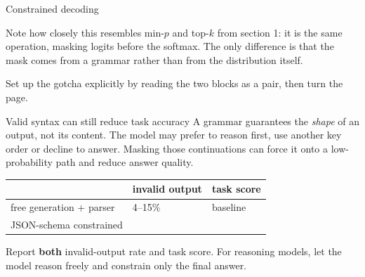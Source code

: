 \documentclass[aspectratio=169,10pt]{beamer}
\begin{document}
\begin{frame}{Constrained decoding}
{  Note how closely this resembles min-$p$ and top-$k$ from section 1: it is the
  same operation, masking logits before the softmax. The only difference is
  that the mask comes from a grammar rather than from the distribution itself.

  Set up the gotcha explicitly by reading the two blocks as a pair, then turn
  the page.}
\end{frame}

\begin{frame}{Valid syntax can still reduce task accuracy}
  A grammar guarantees the \emph{shape} of an output, not its content.
  The model may prefer to reason first, use another key order or decline to
  answer. Masking those continuations can force it onto a low-probability path
  and reduce answer quality.
  \vspace{0.4em}
  \centering
  \begin{tabular}{@{}L{4.0cm} C{3.0cm} C{3.0cm}@{}}
    \toprule
    & \textbf{invalid output} & \textbf{task score}\\
    \midrule
    free generation + parser & 4--15\% & baseline\\
    JSON-schema constrained &  & \\
    \bottomrule
  \end{tabular}

  \vspace{0.3em}
  \raggedright
  Report \textbf{both} invalid-output rate and task score. For reasoning
  models, let the model reason freely and constrain only the final answer.
\end{frame}

\end{document}
